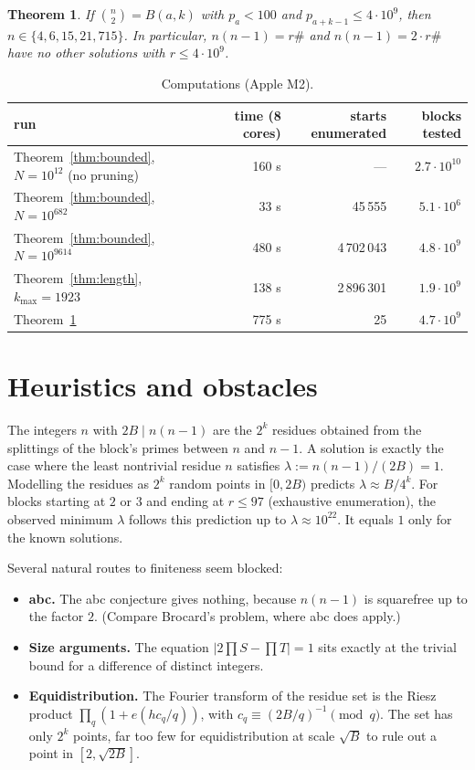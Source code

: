 \documentclass[11pt]{article}
\newtheorem{theorem}{Theorem}
\theoremstyle{remark}
\newcommand{\binomtwo}[1]{\binom{#1}{2}}
\begin{document}
\begin{theorem}\label{thm:small}
If $\binomtwo{n} = B(a,k)$ with $p_a < 100$ and $p_{a+k-1} \le 4\cdot10^9$, then
$n \in \{4,6,15,21,715\}$. In particular, $n(n-1) = r\#$ and $n(n-1) = 2\cdot r\#$ have no
other solutions with $r \le 4\cdot 10^9$.
\end{theorem}

\begin{table}[h]
\centering
\begin{tabular}{lrrr}
\toprule
run & time (8 cores) & starts enumerated & blocks tested \\
\midrule
Theorem~\ref{thm:bounded}, $N = 10^{12}$ (no pruning) & 160 s & --- & $2.7\cdot 10^{10}$ \\
Theorem~\ref{thm:bounded}, $N = 10^{682}$ & 33 s & 45\,555 & $5.1\cdot10^6$ \\
Theorem~\ref{thm:bounded}, $N = 10^{9614}$ & 480 s & 4\,702\,043 & $4.8\cdot10^9$ \\
Theorem~\ref{thm:length}, $k_{\max} = 1923$ & 138 s & 2\,896\,301 & $1.9\cdot10^9$ \\
Theorem~\ref{thm:small} & 775 s & 25 & $4.7\cdot10^9$ \\
\bottomrule
\end{tabular}
\caption{Computations (Apple M2).}
\end{table}

\section{Heuristics and obstacles}

The integers $n$ with $2B \mid n(n-1)$ are the $2^{k}$ residues obtained from the splittings
of the block's primes between $n$ and $n-1$. A solution is exactly the case where the
least nontrivial residue $n$ satisfies $\lambda := n(n-1)/(2B) = 1$. Modelling the residues
as $2^k$ random points in $[0, 2B)$ predicts $\lambda \approx B/4^k$. For blocks starting at
$2$ or $3$ and ending at $r \le 97$ (exhaustive enumeration), the observed minimum
$\lambda$ follows this prediction up to $\lambda \approx 10^{22}$. It equals $1$ only for
the known solutions.

Several natural routes to finiteness seem blocked:
\begin{itemize}
\item \textbf{abc.} The abc conjecture gives nothing, because $n(n-1)$ is squarefree up to
  the factor $2$. (Compare Brocard's problem, where abc does apply.)
\item \textbf{Size arguments.} The equation $|2\prod S - \prod T| = 1$ sits exactly at the
  trivial bound for a difference of distinct integers.
\item \textbf{Equidistribution.} The Fourier transform of the residue set is the Riesz
  product $\prod_q (1 + e(h c_q/q))$, with $c_q \equiv (2B/q)^{-1} \pmod q$. The set has
  only $2^k$ points, far too few for equidistribution at scale $\sqrt{B}$ to rule out a
  point in $[2, \sqrt{2B}]$.
\end{itemize}
\end{document}
